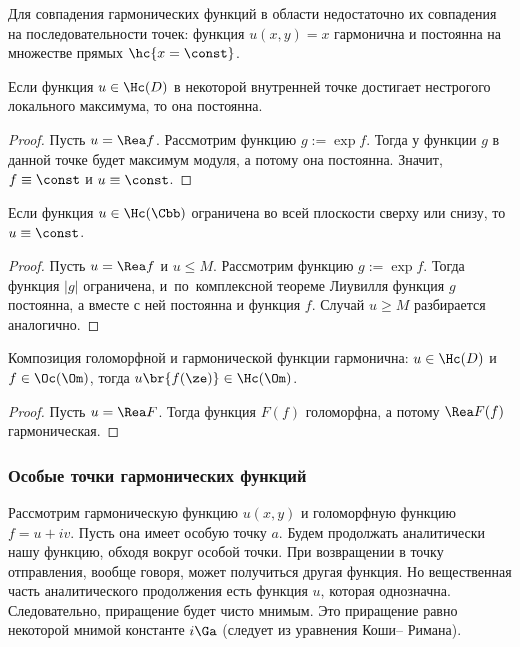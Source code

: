 \documentclass[a4paper]{article}
\begin{document}
\begin{note}
Для совпадения гармонических функций в области недостаточно их совпадения на последовательности точек:
функция $u(x,y) = x$ гармонична и постоянна на множестве прямых $\hc{x=\const}$.
\end{note}

\begin{theorem}
Если функция $u\in \Hc(D)$ в некоторой внутренней точке достигает нестрогого локального максимума, то она постоянна.
\end{theorem}
\begin{proof}
Пусть $u=\Rea f$. Рассмотрим функцию $g := \exp f$. Тогда у функции $g$ в данной точке будет максимум модуля,
а потому она постоянна. Значит, $f\equiv \const$ и $u \equiv \const$.
\end{proof}

\begin{theorem}[Лиувилля]
Если функция $u\in\Hc(\Cbb)$ ограничена во всей плоскости сверху или снизу, то $u\equiv\const$.
\end{theorem}
\begin{proof}
Пусть $u=\Rea f$ и $u \le M$. Рассмотрим функцию $g := \exp f$. Тогда функция $|g|$ ограничена,
и~по~комплексной теореме Лиувилля функция $g$ постоянна, а вместе с ней постоянна и функция $f$.
Случай $u \ge M$ разбирается аналогично.
\end{proof}

\begin{stm}
Композиция голоморфной и гармонической функции гармонична: $u\in \Hc(D)$ и $f \in \Oc(\Om)$, тогда
$u\br{f(\ze)} \in \Hc(\Om)$.
\end{stm}
\begin{proof}
Пусть $u = \Rea F$. Тогда функция $F(f)$ голоморфна, а потому $\Rea F(f)$ гармоническая.
\end{proof}

\subsubsection{Особые точки гармонических функций}

Рассмотрим гармоническую функцию $u(x,y)$ и голоморфную функцию $f = u+iv$. Пусть она имеет
особую точку $a$. Будем продолжать аналитически нашу функцию, обходя вокруг особой точки. При
возвращении в точку отправления, вообще говоря, может получиться другая функция. Но вещественная часть
аналитического продолжения есть функция $u$, которая однозначна. Следовательно, приращение будет чисто
мнимым. Это приращение равно некоторой мнимой константе $i\Ga$ (следует из уравнения Коши-- Римана).
\end{document}
